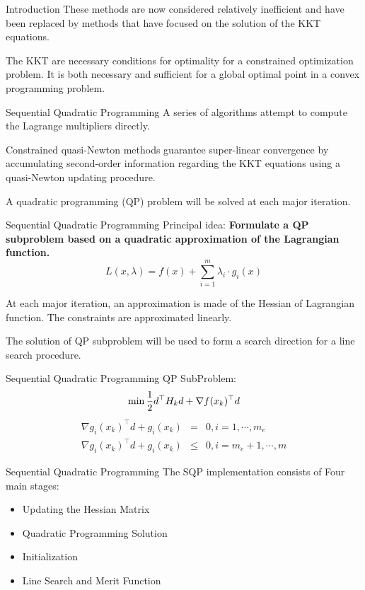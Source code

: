 \documentclass[10pt, compress]{beamer}
\begin{document}
\begin{frame}[fragile]{Introduction}
These methods are now considered relatively inefficient and have been replaced by methods that have focused on the solution of the KKT equations.

The KKT are necessary conditions for optimality for a constrained optimization problem. It is both necessary and sufficient for a global optimal point in a convex programming problem. 
\end{frame}

\begin{frame}[fragile]{Sequential Quadratic Programming}
A series of algorithms attempt to compute the Lagrange multipliers directly.

Constrained quasi-Newton methods guarantee super-linear convergence by accumulating second-order information regarding the KKT equations using a quasi-Newton updating procedure.

A quadratic programming (QP) problem will be solved at each major iteration.
\end{frame}


\begin{frame}[fragile]{Sequential Quadratic Programming}
Principal idea: \textbf{Formulate a QP subproblem based on a quadratic approximation of the Lagrangian function.}
$$L(x, \lambda) = f(x) + \sum_{i=1}^m \lambda_i \cdot g_i(x)$$

At each major iteration, an approximation is made of the Hessian of Lagrangian function. The constraints are approximated linearly. 

The solution of QP subproblem will be used to form a search direction for a line search procedure.
\end{frame}

\begin{frame}[fragile]{Sequential Quadratic Programming}
QP SubProblem:
$$ \min {1 \over 2} d^\top H_k d + \nabla f(x_k)^\top d$$
\begin{eqnarray*}
	\nabla g_i(x_k)^\top d + g_i(x_k) & = & 0, i = 1,\cdots, m_e \\
	\nabla g_i(x_k)^\top d + g_i(x_k) & \leq & 0, i = m_e+1,\cdots, m
\end{eqnarray*}
\end{frame}

\begin{frame}[fragile]{Sequential Quadratic Programming}
The SQP implementation consists of Four main stages:
\begin{itemize}
  \item Updating the Hessian Matrix
  \item Quadratic Programming Solution
  \item Initialization
  \item Line Search and Merit Function
\end{itemize}
\end{frame}
\end{document}

